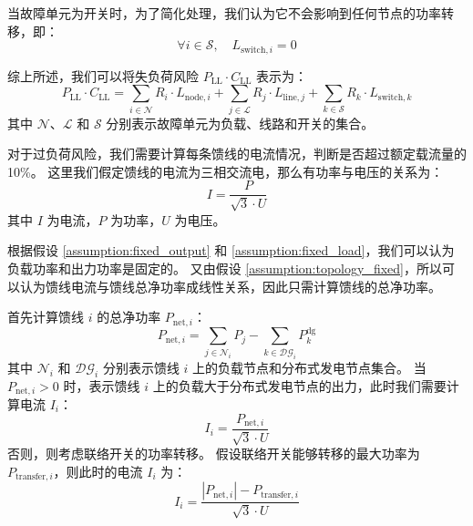 \documentclass{article}
\begin{document}
当故障单元为开关时，为了简化处理，我们认为它不会影响到任何节点的功率转移，即：
\begin{equation}\label{eq:loss_switch}
  \forall i \in \mathcal{S},\quad L_{\text{switch},i} = 0
\end{equation}

综上所述，我们可以将失负荷风险 $P_{\text{LL}} \cdot C_{\text{LL}} $ 表示为：
\begin{equation}\label{eq:loss_total}
  P_{\text{LL}} \cdot C_{\text{LL}}
  = \sum_{i\in\mathcal{N}} R_{i} \cdot L_{\text{node},i}
  + \sum_{j\in\mathcal{L}} R_{j} \cdot L_{\text{line},j}
  + \sum_{k\in\mathcal{S}} R_{k} \cdot L_{\text{switch},k}
\end{equation}
其中 $\mathcal{N}$、$\mathcal{L}$ 和 $\mathcal{S}$ 分别表示故障单元为负载、线路和开关的集合。

对于过负荷风险，我们需要计算每条馈线的电流情况，判断是否超过额定载流量的 10\%。
这里我们假定馈线的电流为三相交流电，那么有功率与电压的关系为：
\begin{equation}\label{eq:current_formula}
  I = \frac{P}{\sqrt{3} \cdot U}
\end{equation}
其中 $I$ 为电流，$P$ 为功率，$U$ 为电压。

根据假设 \ref{assumption:fixed_output} 和 \ref{assumption:fixed_load}，我们可以认为负载功率和出力功率是固定的。
又由假设 \ref{assumption:topology_fixed}，所以可以认为馈线电流与馈线总净功率成线性关系，因此只需计算馈线的总净功率。

首先计算馈线 $i$ 的总净功率 $P_{\text{net},i}$：
\begin{equation}\label{eq:net_power}
  P_{\text{net},i} = \sum_{j\in\mathcal{N}_i} P_j - \sum_{k\in\mathcal{DG}_i} P_k^{\text{dg}}
\end{equation}
其中 $\mathcal{N}_i$ 和 $\mathcal{DG}_i$ 分别表示馈线 $i$ 上的负载节点和分布式发电节点集合。
当 $P_{\text{net},i} > 0$ 时，表示馈线 $i$ 上的负载大于分布式发电节点的出力，此时我们需要计算电流 $I_i$：
\begin{equation}\label{eq:current}
  I_i = \frac{P_{\text{net},i}}{\sqrt{3} \cdot U}
\end{equation}
否则，则考虑联络开关的功率转移。
假设联络开关能够转移的最大功率为 $P_{\text{transfer},i}$，则此时的电流 $I_i$ 为：
\begin{equation}\label{eq:current_transfer}
  I_i = \frac{|P_{\text{net},i}| - P_{\text{transfer},i}}{\sqrt{3} \cdot U}
\end{equation}
\end{document}
